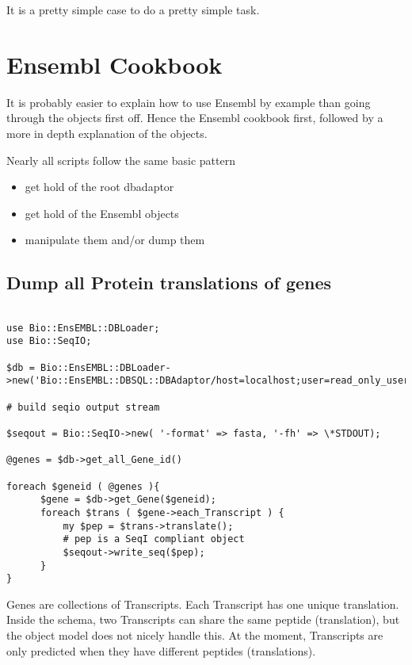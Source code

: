 \documentclass[11pt,a4paper]{article}
\begin{document}
It is a pretty simple case to do a pretty simple task. 

\section{Ensembl Cookbook}


It is probably easier to explain how to use Ensembl by example than going
through the objects first off. Hence the Ensembl cookbook first, followed by 
a more in depth explanation of the objects.

Nearly all scripts follow the same basic pattern

\begin{itemize}
\item get hold of the root dbadaptor 
\item get hold of the Ensembl objects 
\item manipulate them and/or dump them
\end{itemize} 


\subsection{Dump all Protein translations of genes}

\begin{verbatim}

use Bio::EnsEMBL::DBLoader;
use Bio::SeqIO;

$db = Bio::EnsEMBL::DBLoader->new('Bio::EnsEMBL::DBSQL::DBAdaptor/host=localhost;user=read_only_user;dbname=test_ensembl');

# build seqio output stream

$seqout = Bio::SeqIO->new( '-format' => fasta, '-fh' => \*STDOUT);

@genes = $db->get_all_Gene_id()

foreach $geneid ( @genes ){
      $gene = $db->get_Gene($geneid);
      foreach $trans ( $gene->each_Transcript ) {
          my $pep = $trans->translate();
          # pep is a SeqI compliant object
          $seqout->write_seq($pep);
      }
}

\end{verbatim}

Genes are collections of Transcripts. Each Transcript has one unique
translation. Inside the schema, two Transcripts can share the same
peptide (translation), but the object model does not nicely handle
this. At the moment, Transcripts are only predicted when they have
different peptides (translations).
\end{document}
